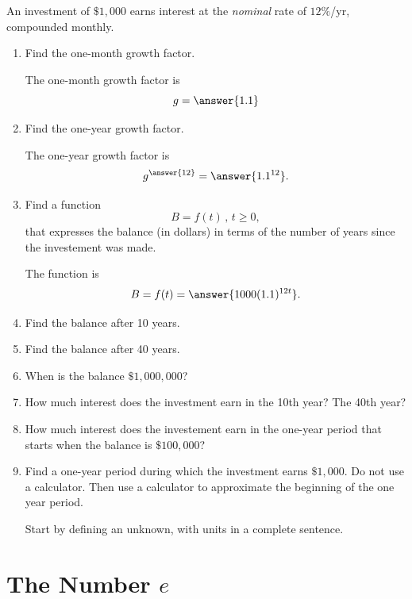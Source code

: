 \documentclass{ximera}
\begin{document}
\begin{example} \label{ExLdferr3r3}
An investment of $\$1,000$ earns interest at the \emph{nominal} rate of $12\%$/yr, compounded monthly.

\begin{enumerate}
\item Find the one-month growth factor.

The one-month growth factor is 
\[
   g = \answer{1.1}
\]

\item Find the one-year growth factor.

The one-year growth factor is
\[
  g^{\answer{12}} = \answer{1.1^{12}}.
\]


\item Find a function 
\[
   B = f(t) \, , \, t\geq 0,
\]
that expresses the balance (in dollars) in terms of the number of years since the investement was made.

The function is
\[
     B = f(t) = \answer{1000(1.1)^{12t}} .
\]


\item Find the balance after 10 years.

\item Find the balance after 40 years.

\item When is the balance $\$1,000,000$?

\item How much interest does the investment earn in the 10th year? The 40th year?

\item How much interest does the investement earn in the one-year period that starts when the balance is $\$100,000$?

\item Find a one-year period during which the investment earns $\$1,000$. Do not use a calculator. Then use a calculator to approximate the beginning of the one year period.

Start by defining an unknown, with units in a complete sentence.

\end{enumerate}
\end{example}


\section{The Number $e$}
\end{document}
